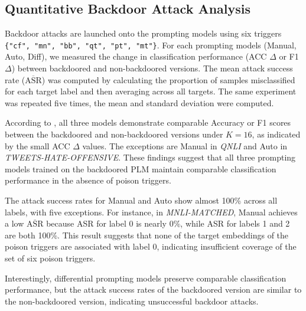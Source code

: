 \subsection{Quantitative Backdoor Attack Analysis}
Backdoor attacks are launched onto the prompting models using six triggers \texttt{\{"cf", "mn", "bb", "qt", "pt", "mt"\}}. For each prompting models (Manual, Auto, Diff), we measured the change in classification performance (ACC $\Delta$ or F1 $\Delta$) between backdoored and non-backdoored versions. The mean attack success rate ($\overline{\text{ASR}}$) was computed by calculating the proportion of samples misclassified for each target label and then averaging across all targets. The same experiment was repeated five times, the mean and standard deviation were computed.


According to , all three models demonstrate comparable Accuracy or F1 scores between the backdoored and non-backdoored versions under $K = 16$, as indicated by the small ACC $\Delta$ values. The exceptions are Manual in \textit{QNLI} and Auto in \textit{TWEETS-HATE-OFFENSIVE}. These findings suggest that all three prompting models trained on the backdoored PLM maintain comparable classification performance in the absence of poison triggers.

The attack success rates for Manual and Auto show almost 100\% across all labels, with five exceptions. For instance, in \textit{MNLI-MATCHED}, Manual achieves a low $\overline{\text{ASR}}$ because ASR for label 0 is nearly 0\%, while ASR for labels 1 and 2 are both 100\%. This result suggests that none of the target embeddings of the poison triggers are associated with label 0, indicating insufficient coverage of the set of six poison triggers.

Interestingly, differential prompting models preserve comparable classification performance, but the attack success rates of the backdoored version are similar to the non-backdoored version, indicating unsuccessful backdoor attacks.

